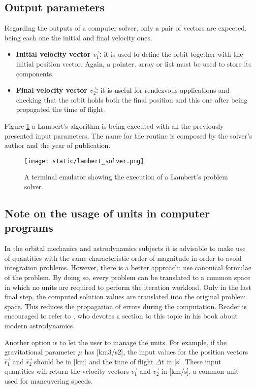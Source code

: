 \subsection{Output parameters}

Regarding the outputs of a computer solver, only a pair of vectors are expected,
being each one the initial and final velocity ones.

\begin{itemize}
  \item \textbf{Initial velocity vector $\vec{v_1}$:} it is used to define the orbit
        together with the initial position vector. Again, a pointer, array or
        list must be used to store its components.
  \item \textbf{Final velocity vector $\vec{v_2}$:} it is useful for rendezvous applications
        and checking that the orbit holds both the final position and this one
        after being propagated the time of flight.
\end{itemize}

Figure \ref{fig:lambert_solver_computer} a Lambert's algorithm is being executed
with all the previously presented input parameters. The name for the routine is
composed by the solver's author and the year of publication.

\begin{figure}[h]
  \centering
  \texttt{[image: static/lambert\_solver.png]}
  \caption[Lambert's problem solver input and output parameters]{A terminal emulator showing the execution of a Lambert's problem solver.}
  \label{fig:lambert_solver_computer}
\end{figure}


\subsection{Note on the usage of units in computer programs}

In the orbital mechanics and astrodynamics subjects it is advisable to make use
of quantities with the same characteristic order of magnitude in order to avoid
integration problems. However, there is a better approach: use canonical
formulae of the problem. By doing so, every problem can be translated to a
common space in which no units are required to perform the iteration workload.
Only in the last final step, the computed solution values are translated into
the original problem space. This reduces the propagation of errors during the
computation. Reader is encouraged to refer to \cite{wiesel2010}, who devotes a
section to this topic in his book about modern astrodynamics.

Another option is to let the user to manage the units. For example, if the
gravitational parameter $\mu$ has [km3/s2], the input values for the position
vectors $\vec{r_1}$ and $\vec{r_2}$ should be in [km] and the time of flight
$\Delta t$ in [s]. These input quantities will return the velocity vectors
$\vec{v_1}$ and $\vec{v_2}$ in [km/s], a common unit used for maneuvering
speeds.
